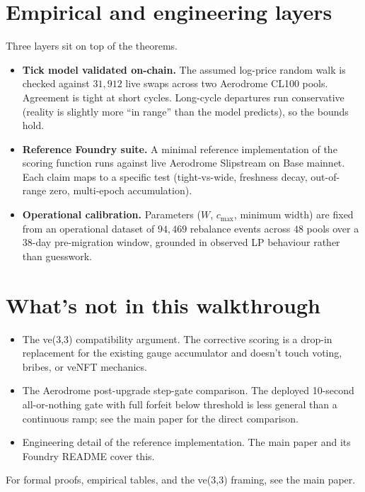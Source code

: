 \documentclass[11pt,a4paper]{article}
\begin{document}
\section{Empirical and engineering layers}

Three layers sit on top of the theorems.

\begin{itemize}[leftmargin=2em]
\item \textbf{Tick model validated on-chain.} The assumed log-price random walk is checked against $31{,}912$ live swaps across two Aerodrome CL100 pools. Agreement is tight at short cycles. Long-cycle departures run conservative (reality is slightly more ``in range'' than the model predicts), so the bounds hold.
\item \textbf{Reference Foundry suite.} A minimal reference implementation of the scoring function runs against live Aerodrome Slipstream on Base mainnet. Each claim maps to a specific test (tight-vs-wide, freshness decay, out-of-range zero, multi-epoch accumulation).
\item \textbf{Operational calibration.} Parameters ($W$, $c_{\max}$, minimum width) are fixed from an operational dataset of $94{,}469$ rebalance events across $48$ pools over a $38$-day pre-migration window, grounded in observed LP behaviour rather than guesswork.
\end{itemize}

\section{What's not in this walkthrough}

\begin{itemize}[leftmargin=2em]
\item The ve(3,3) compatibility argument. The corrective scoring is a drop-in replacement for the existing gauge accumulator and doesn't touch voting, bribes, or veNFT mechanics.
\item The Aerodrome post-upgrade step-gate comparison. The deployed 10-second all-or-nothing gate with full forfeit below threshold is less general than a continuous ramp; see the main paper for the direct comparison.
\item Engineering detail of the reference implementation. The main paper and its Foundry README cover this.
\end{itemize}

For formal proofs, empirical tables, and the ve(3,3) framing, see the main paper.
\end{document}
